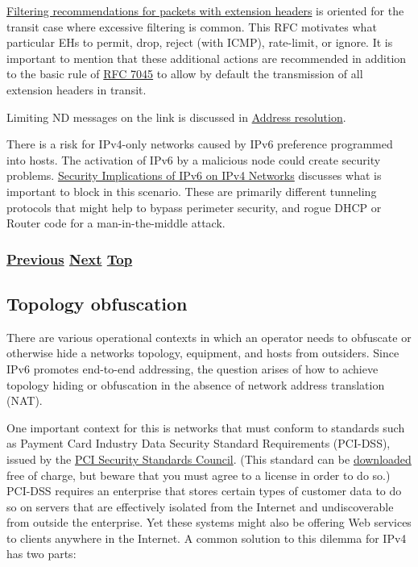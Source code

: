 \documentclass[
]{article}
\begin{document}
\href{https://www.rfc-editor.org/info/rfc9288}{Filtering recommendations
for packets with extension headers} is oriented for the transit case
where excessive filtering is common. This RFC motivates what particular
EHs to permit, drop, reject (with ICMP), rate-limit, or ignore. It is
important to mention that these additional actions are recommended in
addition to the basic rule of
\href{https://www.rfc-editor.org/info/rfc7045}{RFC 7045} to allow by
default the transmission of all extension headers in transit.

Limiting ND messages on the link is discussed in
\hyperref[address-resolution]{Address resolution}.

There is a risk for IPv4-only networks caused by IPv6 preference
programmed into hosts. The activation of IPv6 by a malicious node could
create security problems.
\href{https://www.rfc-editor.org/info/rfc7123}{Security Implications of
IPv6 on IPv4 Networks} discusses what is important to block in this
scenario. These are primarily different tunneling protocols that might
help to bypass perimeter security, and rogue DHCP or Router code for a
man-in-the-middle attack.

\subsubsection{\texorpdfstring{\hyperref[layer-2-considerations]{Previous}
\hyperref[topology-obfuscation]{Next}
\hyperref[security]{Top}}{Previous Next Top}}\label{previous-next-top-23}

\pagebreak

\subsection{Topology obfuscation}\label{topology-obfuscation}

There are various operational contexts in which an operator needs to
obfuscate or otherwise hide a network\textquotesingle s topology,
equipment, and hosts from outsiders. Since IPv6 promotes end-to-end
addressing, the question arises of how to achieve topology hiding or
obfuscation in the absence of network address translation (NAT).

One important context for this is networks that must conform to
standards such as Payment Card Industry Data Security Standard
Requirements (PCI-DSS), issued by the
\href{https://www.pcisecuritystandards.org}{PCI Security Standards
Council}. (This standard can be
\href{https://docs-prv.pcisecuritystandards.org/PCI\%20DSS/Standard/PCI-DSS-v4_0.pdf}{downloaded}
free of charge, but beware that you must agree to a license in order to
do so.) PCI-DSS requires an enterprise that stores certain types of
customer data to do so on servers that are effectively isolated from the
Internet and undiscoverable from outside the enterprise. Yet these
systems might also be offering Web services to clients anywhere in the
Internet. A common solution to this dilemma for IPv4 has two parts:
\end{document}
